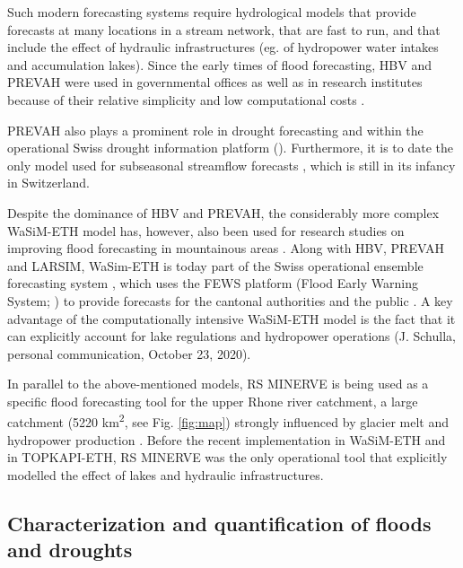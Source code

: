 \documentclass[10pt,a4paper]{article}
\begin{document}
Such modern forecasting systems require hydrological models that provide
forecasts at many locations in a stream network, that are fast to run,
and that include the effect of hydraulic infrastructures (eg. of
hydropower water intakes and accumulation lakes). Since the early times
of flood forecasting, HBV and PREVAH were used in governmental offices
\citep{Karsten2016} as well as in research institutes because of their
relative simplicity and low computational costs \citep{Verbunt2006,Addor_2011,Murphy_2019,Antonetti2019}.

PREVAH also plays a prominent role in drought
forecasting \citep{Fundel2013,J_rg_Hess_2015,Bogner2018b} and within the operational Swiss drought
information platform (\citealp{Stahli2013}). Furthermore, it is to date
the only model used for subseasonal streamflow
forecasts \citep{Monhart_2019,Anghileri2019}, which is still in its infancy in
Switzerland.

Despite the dominance of HBV and PREVAH, the considerably more complex
WaSiM-ETH model has, however, also been used for research studies on
improving flood forecasting in mountainous areas \citep{Jasper2003,Ahrens2003b,Jasper2002}.
Along with HBV, PREVAH and LARSIM, WaSim-ETH is today part of the Swiss
operational ensemble forecasting system \citep{Karsten2016}, which uses
the FEWS platform (Flood Early Warning System; \citealp{Werner_2013}) to
provide forecasts for the cantonal authorities and the
public \citep{FOEN2019}. A key advantage of the computationally
intensive WaSiM-ETH model is the fact that it can explicitly account for
lake regulations and hydropower operations (J. Schulla, personal
communication, October 23, 2020). 

In parallel to the above-mentioned models, RS MINERVE is being used as a
specific flood forecasting tool for the upper Rhone river catchment, a
large catchment (5220 km\textsuperscript{2}, see
Fig. \ref{fig:map}) strongly influenced by glacier
melt and hydropower production \citep{GarciaHernandez2009b,GarciaHernandez2009,Jordan2010}. 
Before the recent implementation in WaSiM-ETH and in TOPKAPI-ETH, RS MINERVE was the only
operational tool that explicitly modelled the effect of lakes and
hydraulic infrastructures.

\subsection{Characterization and quantification of floods and droughts}
\label{sec:application:floodsdroughts}
\end{document}
